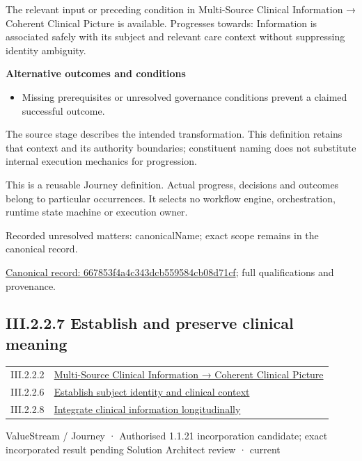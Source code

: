 The relevant input or preceding condition in Multi-Source Clinical Information → Coherent Clinical Picture is available. Progresses towards: Information is associated safely with its subject and relevant care context without suppressing identity ambiguity.



\par\medskip\textbf{Alternative outcomes and conditions}\par


\begin{itemize}


\item Missing prerequisites or unresolved governance conditions prevent a claimed successful outcome.

\end{itemize}


The source stage describes the intended transformation. This definition retains that context and its authority boundaries; constituent naming does not substitute internal execution mechanics for progression.



This is a reusable Journey definition. Actual progress, decisions and outcomes belong to particular occurrences. It selects no workflow engine, orchestration, runtime state machine or execution owner.


{\small Recorded unresolved matters: canonicalName; exact scope remains in the canonical record.}\par
{\footnotesize \href{../../../../continuum/strategy/value-stream/667853f4a4c343dcb559584cb08d71cf.md}{Canonical record: 667853f4a4c343dcb559584cb08d71cf}; full qualifications and provenance.}\par
\subsection*{III.2.2.7 Establish and preserve clinical meaning}
\label{navigation:III.2.2.7}

\begin{longtable}{p{.22\linewidth}p{.73\linewidth}}
III.2.2.2 & \hyperref[element:01f655eae3d8485699449c3dcf4f9b56]{Multi-Source Clinical Information → Coherent Clinical Picture} \\
III.2.2.6 & \hyperref[element:667853f4a4c343dcb559584cb08d71cf]{Establish subject identity and clinical context} \\
III.2.2.8 & \hyperref[element:80b2d41cb7fc4c929cee667353caa411]{Integrate clinical information longitudinally} \\
\end{longtable}
\label{element:e64c4ed500d84f0fa84a12646ea8b98d}
{\small ValueStream / Journey · Authorised 1.1.21 incorporation candidate; exact incorporated result pending Solution Architect review · current}\par

